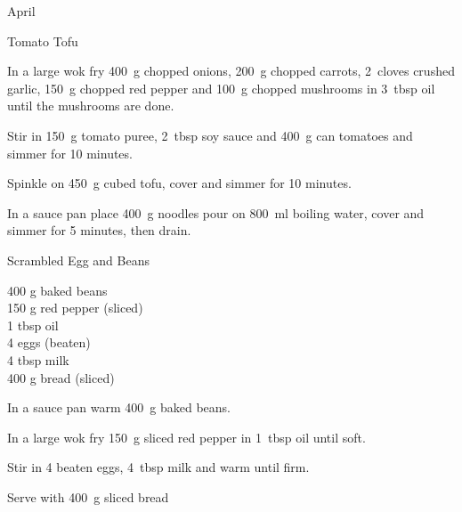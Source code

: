 \begin{menu}{April}
\begin{recipe}{2}{Tomato Tofu}
	
    \begin{instructions}
    \item 
        In a large wok fry
        400~g chopped onions,
        200~g chopped carrots,
        2~cloves crushed garlic,
        150~g chopped red pepper
        and
        100~g chopped mushrooms
        in
        3~tbsp  oil
        until the mushrooms are done.
      \item 
        Stir in
        150~g  tomato puree,
        2~tbsp  soy sauce
        and
        400~g  can tomatoes
        and simmer for 10 minutes.
      \item 
        Spinkle on
        450~g cubed tofu,
        cover and simmer for 10 minutes.
      \item 
    In a
    sauce pan
    place
    400~g  noodles
    pour on
    800~ml  boiling water,
    cover and simmer for 5 minutes, then drain.
  
    \end{instructions}
    \end{recipe}%
  
    \begin{recipe}{1}{Scrambled Egg and Beans}%
		\begin{ingredients}
		400 g baked beans  \\
	150 g red pepper (sliced) \\
	1 tbsp oil  \\
	4  eggs (beaten) \\
	4 tbsp milk  \\
	400 g bread (sliced) \\
	
		\end{ingredients}
	
	
    \begin{instructions}
    \item 
        In a sauce pan warm
        400~g  baked beans.
      \item 
        In a large wok fry
        150~g sliced red pepper
        in
        1~tbsp  oil
        until soft.
      \item 
        Stir in
        4 beaten eggs,
        4~tbsp  milk
        and warm until firm.
      \item 
        Serve with
        400~g sliced bread
    \end{instructions}
    \end{recipe}%
  
    \clearpage
    \end{menu}
	
